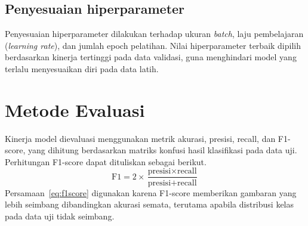 \begin{table}[htbp]
  \centering
  \caption{Ringkasan arsitektur model LSTM yang diusulkan}
  \label{tab:arsitektur}
\end{table}

\subsection{Penyesuaian hiperparameter}
Penyesuaian hiperparameter dilakukan terhadap ukuran \textit{batch},
laju pembelajaran (\textit{learning rate}), dan jumlah epoch
pelatihan. Nilai hiperparameter terbaik dipilih berdasarkan kinerja
tertinggi pada data validasi, guna menghindari model yang terlalu
menyesuaikan diri pada data latih.

\section{Metode Evaluasi}
Kinerja model dievaluasi menggunakan metrik akurasi, presisi, recall,
dan F1-score, yang dihitung berdasarkan matriks konfusi hasil
klasifikasi pada data uji. Perhitungan F1-score dapat dituliskan
sebagai berikut.
\begin{equation}
  \text{F1} = 2 \times \frac{\text{presisi} \times \text{recall}}{\text{presisi} + \text{recall}}
  \label{eq:f1score}
\end{equation}
Persamaan~\eqref{eq:f1score} digunakan karena F1-score memberikan
gambaran yang lebih seimbang dibandingkan akurasi semata, terutama
apabila distribusi kelas pada data uji tidak seimbang.
